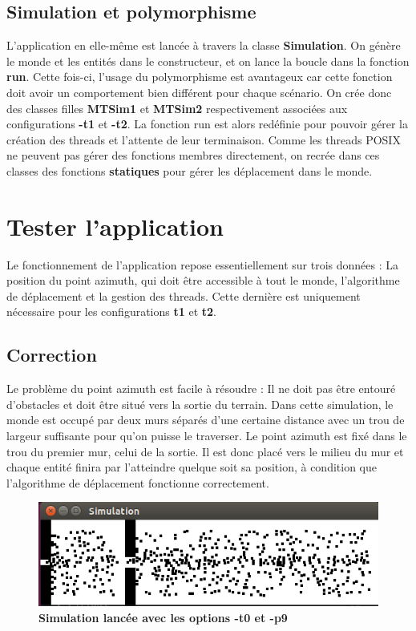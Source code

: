 \documentclass[11pt]{article} %
\begin{document}
\subsection{Simulation et polymorphisme}
L'application en elle-même est lancée à travers la classe \textbf{Simulation}. On génère le monde et les entités dans le constructeur, et on lance la boucle dans la fonction \textbf{run}. Cette fois-ci, l'usage du polymorphisme est avantageux car cette fonction doit avoir un comportement bien différent pour chaque scénario. On crée donc des classes filles \textbf{MTSim1} et \textbf{MTSim2} respectivement associées aux configurations \textbf{-t1} et \textbf{-t2}. La fonction run est alors redéfinie pour pouvoir gérer la création des threads et l'attente de leur terminaison. Comme les threads POSIX ne peuvent pas gérer des fonctions membres directement, on recrée dans ces classes des fonctions \textbf{statiques} pour gérer les déplacement dans le monde. 

\section{Tester l'application}
Le fonctionnement de l'application repose essentiellement sur trois données : La position du point azimuth, qui doit être accessible à tout le monde, l'algorithme de déplacement et la gestion des threads. Cette dernière est uniquement nécessaire pour les configurations \textbf{t1} et \textbf{t2}.

\subsection{Correction}

Le problème du point azimuth est facile à résoudre : Il ne doit pas être entouré d'obstacles et doit être situé vers la sortie du terrain. Dans cette simulation, le monde est occupé par deux murs séparés d'une certaine distance avec un trou de largeur suffisante pour qu'on puisse le traverser. Le point azimuth est fixé dans le trou du premier mur, celui de la sortie. Il est donc placé vers le milieu du mur et chaque entité finira par l'atteindre quelque soit sa position, à condition que l'algorithme de déplacement fonctionne correctement.


\begin{figure}[h]
\caption{\label{f1} \textbf{Simulation lancée avec les options -t0 et -p9}}
  \centering
\includegraphics[width=12cm]{graph}
\end{figure}
\end{document}
